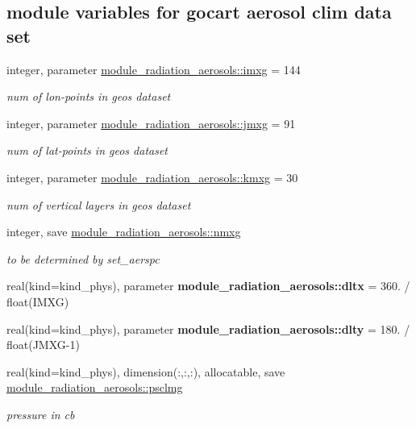 \subsection*{module variables for gocart aerosol clim data set}
\begin{DoxyCompactItemize}
\item 
integer, parameter \hyperlink{group__module__radiation__aerosols_gaa7b2e0e1d0669af4efc75cb32301f1f1}{module\+\_\+radiation\+\_\+aerosols\+::imxg} = 144
\begin{DoxyCompactList}\small\item\em num of lon-\/points in geos dataset \end{DoxyCompactList}\item 
integer, parameter \hyperlink{group__module__radiation__aerosols_ga816ee06781e63adf8752a9a67ab2da2d}{module\+\_\+radiation\+\_\+aerosols\+::jmxg} = 91
\begin{DoxyCompactList}\small\item\em num of lat-\/points in geos dataset \end{DoxyCompactList}\item 
integer, parameter \hyperlink{group__module__radiation__aerosols_ga5339e589d92fab8cbb310b84b6ca3d9e}{module\+\_\+radiation\+\_\+aerosols\+::kmxg} = 30
\begin{DoxyCompactList}\small\item\em num of vertical layers in geos dataset \end{DoxyCompactList}\item 
integer, save \hyperlink{group__module__radiation__aerosols_gadb4c4cdc8e3212777229d1f54e79bb05}{module\+\_\+radiation\+\_\+aerosols\+::nmxg}
\begin{DoxyCompactList}\small\item\em to be determined by set\+\_\+aerspc \end{DoxyCompactList}\item 
real(kind=kind\+\_\+phys), parameter {\bfseries module\+\_\+radiation\+\_\+aerosols\+::dltx} = 360. / float(I\+M\+XG)
\item 
real(kind=kind\+\_\+phys), parameter {\bfseries module\+\_\+radiation\+\_\+aerosols\+::dlty} = 180. / float(J\+M\+XG-\/1)
\item 
real(kind=kind\+\_\+phys), dimension(\+:,\+:,\+:), allocatable, save \hyperlink{group__module__radiation__aerosols_ga942aa3a9f61cb40592bd0879a91c2ede}{module\+\_\+radiation\+\_\+aerosols\+::psclmg}
\begin{DoxyCompactList}\small\item\em pressure in cb \end{DoxyCompactList}\item 

\end{DoxyCompactItemize}
